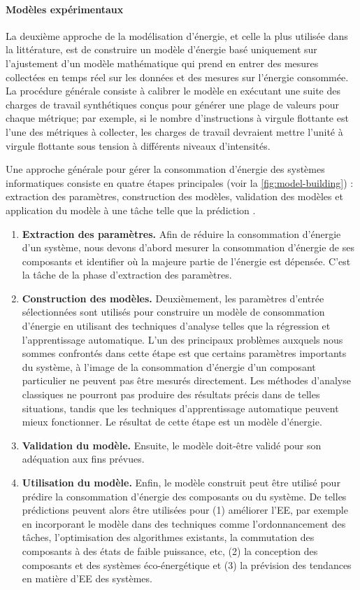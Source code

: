 \paragraph{Modèles expérimentaux}
La deuxième approche de la modélisation d'énergie, et celle la plus utilisée dans la littérature, est de construire un modèle d'énergie basé uniquement sur l'ajustement d'un modèle mathématique qui prend en entrer des mesures collectées en temps réel sur les données et des mesures sur l'énergie consommée. La procédure générale consiste à calibrer le modèle en exécutant une suite des charges de travail synthétiques conçus pour générer une plage de valeurs pour chaque métrique; par exemple, si le nombre d'instructions à virgule flottante est l'une des métriques à collecter, les charges de travail devraient mettre l'unité à virgule flottante sous tension à différents niveaux d'intensités.

Une approche générale pour gérer la consommation d'énergie des systèmes informatiques consiste en quatre étapes principales (voir la \ref{fig:model-building}) : extraction des paramètres, construction des modèles, validation des modèles et application du modèle à une tâche telle que la prédiction \cite{Dayarathna16}.

\begin{enumerate}
 \item \textbf{Extraction des paramètres.} Afin de réduire la consommation d'énergie d'un système, nous devons d'abord mesurer la consommation d'énergie de ses composants et identifier où la majeure partie de l'énergie est dépensée. C'est la tâche de la phase d'extraction des paramètres.
 \item \textbf{Construction des modèles.} Deuxièmement, les paramètres d'entrée sélectionnées sont utilisés pour construire un modèle de consommation d'énergie en utilisant des techniques d'analyse telles que la régression et l'apprentissage automatique. L'un des principaux problèmes auxquels nous sommes confrontés dans cette étape est que certains paramètres importants du système, à l'image de la consommation d'énergie d'un composant particulier ne peuvent pas être mesurés directement. Les méthodes d'analyse classiques ne pourront pas produire des résultats précis dans de telles situations, tandis que les techniques d'apprentissage automatique peuvent mieux fonctionner. Le résultat de cette étape est un modèle d'énergie.
 \item \textbf{Validation du modèle.} Ensuite, le modèle doit-être validé pour son adéquation aux fins prévues.
 \item \textbf{Utilisation du modèle.} Enfin, le modèle construit peut être utilisé pour prédire la consommation d'énergie des composants ou du système. De telles prédictions peuvent alors être utilisées pour (1) améliorer l'EE, par exemple en incorporant le modèle dans des techniques comme l'ordonnancement des tâches, l'optimisation des algorithmes existants, la commutation des composants à des états de faible puissance, etc, (2) la conception des composants et des systèmes éco-énergétique et (3) la prévision des tendances en matière d'EE des systèmes.
\end{enumerate}

